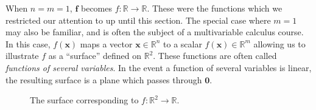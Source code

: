 \documentclass{article}
\newcommand{\R}{\mathbb{R}}
\newcommand{\x}{\mathbf{x}}
\newcommand{\f}{\mathbf{f}}
\newcommand{\ze}{\mathbf{0}}
\theoremstyle{definition}
\begin{document}
When $ n=m=1 $, $ \f $ becomes $ f:\R\to\R $. These were the functions which we restricted our attention to up until this section. The special case where $ m = 1 $ may also be familiar, and is often the subject of a multivariable calculus course. In this case, $ f(\x) $ maps a vector $ \x\in\R^n $ to a scalar $ f(\x)\in\R^m $ allowing us to illustrate $ f $ as a ``surface'' defined on $ \R^2 $. These functions are often called \textit{\color{red}functions of several variables}. In the event a function of several variables is linear, the resulting surface is a plane which passes through $ \ze $. 
\begin{figure}[h!]
	\centering
	\caption{The surface corresponding to $ f:\R^2 \to \R $. }
\end{figure}	
\end{document}
